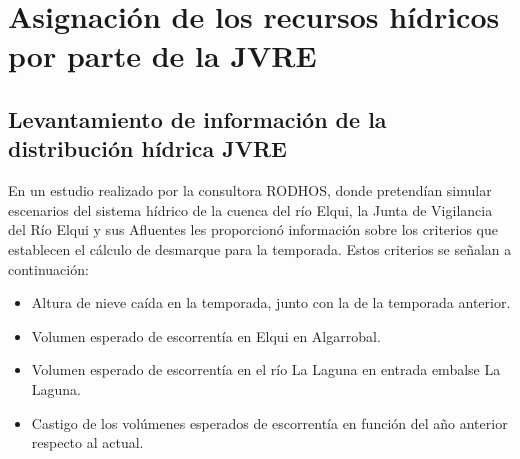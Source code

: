 \documentclass[10pt,]{article}
\begin{document}
    	
		
	


\section{Asignación de los recursos hídricos por parte de la JVRE}\bigskip





		\subsection{Levantamiento de información de la distribución hídrica JVRE}
		En un estudio realizado por la consultora RODHOS, donde pretendían simular escenarios del sistema hídrico de la cuenca del río Elqui, la Junta de Vigilancia del Río Elqui y sus Afluentes les proporcionó información sobre los criterios que establecen el cálculo de desmarque para la temporada. Estos criterios se señalan a continuación:\bigskip
		
		\begin{itemize}
		
		\item Altura de nieve caída en la temporada, junto con la de la temporada anterior.
		\item Volumen esperado de escorrentía en Elqui en Algarrobal.
		\item Volumen esperado de escorrentía en el río La Laguna en entrada embalse La Laguna.
		\item Castigo de los volúmenes esperados de escorrentía en función del año anterior respecto al actual.
		
		\end{itemize}
		
\end{document}
